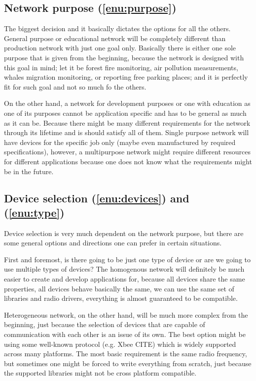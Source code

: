 \documentclass[
  print, %
  table,   %
  nolof,     %
  nolot,     %
           oneside
]{fithesis3}
\begin{document}
  \subsection{Network purpose (\ref{enu:purpose})}
  The biggest decision and it basically dictates the options for all the others. General purpose or educational network will be completely different than production network with just one goal only. Basically there is either one sole purpose that is given from the beginning, because the network is designed with this goal in mind; let it be forest fire monitoring, air pollution measurements, whales migration monitoring, or reporting free parking places; and it is perfectly fit for such goal and not so much fo the others.

  On the other hand, a network for development purposes or one with education as one of its purposes cannot be application specific and has to be general as much as it can be. Because there might be many different requirements for the network through its lifetime and is should satisfy all of them. Single purpose network will have devices for the specific job only (maybe even manufactured by required specifications), however, a multipurpose network might require different resources for different applications because one does not know what the requirements might be in the future.

  \subsection{Device selection (\ref{enu:devices}) and (\ref{enu:type})}
  Device selection is very much dependent on the network purpose, but there are some general options and directions one can prefer in certain situations.

  First and foremost, is there going to be just one type of device or are we going to use multiple types of devices? The homogenous network will definitely be much easier to create and develop applications for, because all devices share the same properties, all devices behave basically the same, we can use the same set of libraries and radio drivers, everything is almost guaranteed to be compatible.

  Heterogeneous network, on the other hand, will be much more complex from the beginning, just because the selection of devices that are capable of communication with each other is an issue of its own. The best option might be using some well-known protocol (e.g. Xbee CITE) which is widely supported across many platforms. The most basic requirement is the same radio frequency, but sometimes one might be forced to write everything from scratch, just because the supported libraries might not be cross platform compatible.
\end{document}
